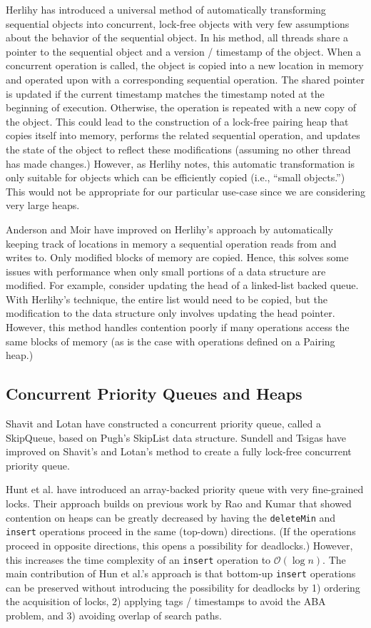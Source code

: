 \documentclass{acm_proc_article-sp}
\begin{document}
Herlihy \cite{herlihy93} has introduced a universal method of automatically
transforming sequential objects
into concurrent, lock-free objects with very few assumptions about the behavior
of the sequential object. In his method, all threads share a pointer to
the sequential object and a version / timestamp of the object.
When a concurrent operation is called, the object is copied into
a new location in memory and operated upon with a corresponding sequential operation.
The shared pointer is updated if the current timestamp matches the timestamp noted at the beginning
of execution. Otherwise,
the operation is repeated with a new copy of the object. This could lead to the construction
of a lock-free pairing heap that copies itself into memory, performs the related sequential
operation, and updates the state of the object to reflect these modifications (assuming no
other thread has made changes.) However, as Herlihy notes, this automatic transformation
is only suitable for objects which can be efficiently copied (i.e., ``small objects.'')
This would not be appropriate for our particular use-case since we are considering
very large heaps.

Anderson and Moir \cite{anderson99} have improved on Herlihy's approach by
automatically keeping track of locations in memory a sequential operation
reads from and writes to. Only modified blocks of memory are copied. Hence,
this solves some issues with performance when only small portions of a data
structure are modified. For example, consider updating the head of a linked-list backed queue.
With Herlihy's technique, the entire list would need to be copied, but the modification
to the data structure only involves updating the head pointer.
However, this method handles contention poorly if many operations
access the same blocks of memory (as is the case with operations defined on
a Pairing heap.)

\subsection{Concurrent Priority Queues and Heaps}
Shavit and Lotan have constructed \cite{shavit00}
a concurrent priority queue, called a SkipQueue,
based on Pugh's SkipList
\cite{pugh90} data structure.
Sundell and Tsigas \cite{sundell05} have improved on Shavit's
and Lotan's method to create a fully lock-free concurrent
priority queue.

Hunt et al. \cite{hunt96} have introduced an array-backed priority
queue with very fine-grained locks. Their approach
builds on previous work by Rao and Kumar
\cite{rao88} that showed contention on heaps can be greatly decreased
by having the \texttt{deleteMin} and \texttt{insert} operations proceed in
the same (top-down) directions. (If the operations proceed in opposite directions,
this opens a possibility for deadlocks.) However, this increases the
time complexity
of an \texttt{insert} operation to $\mathcal{O}(\log n)$.
The main contribution of Hun et al.'s
approach is that bottom-up \texttt{insert} operations
can be
preserved without introducing the possibility for deadlocks
by 1) ordering the acquisition of locks, 2) applying
tags / timestamps to avoid the ABA problem, and 3) avoiding overlap
of search paths.
\end{document}
